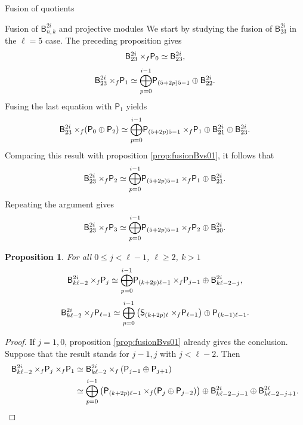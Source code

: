 \documentclass[reqno]{amsart}
\newtheorem{Prop}[Thm]{Proposition}
\newcommand{\ds}[1]{\mathsf S_{#1}}
\newcommand{\dP}[1]{\mathsf P_{#1}}
\newcommand{\xf}{\times\hspace{-0.27em}_f}
\newcommand{\B}[2]{\mathsf{B}^{#1}_{#2}}
\newcommand{\lc}{\ell}
\begin{document}
\begin{section}{Fusion of quotients}
\begin{subsection}{Fusion of $\B{2i}{n,k}$ and projective modules}
We start by studying the fusion of $\B{2i}{23}$ in the $\lc=5$ case. The preceding proposition gives
\begin{equation}
	\B{2i}{23} \xf \dP{0} \simeq \B{2i}{23},
\end{equation}
\begin{equation}
	\B{2i}{23} \xf \dP{1} \simeq \overset{i-1}{\underset{p = 0}{\bigoplus}}\dP{(5+2p) 5 - 1} \oplus \B{2i}{22}.
\end{equation}
Fusing the last equation with $\dP{1}$ yields
\begin{equation}
	\B{2i}{23} \xf (\dP{0} \oplus \dP{2}) \simeq \overset{i-1}{\underset{p = 0}{\bigoplus}}\dP{(5+2p)5-1} \xf \dP{1} \oplus \B{2i}{21} \oplus \B{2i}{23}.
\end{equation}
Comparing this result with proposition \ref{prop:fusionBvs01}, it follows that
\begin{equation}
	\B{2i}{23} \xf \dP{2} \simeq \overset{i-1}{\underset{p = 0}{\bigoplus}}\dP{(5+2p)5-1} \xf \dP{1} \oplus \B{2i}{21}.
\end{equation}
Repeating the argument gives
\begin{equation}
	\B{2i}{23} \xf \dP{3} \simeq \overset{i-1}{\underset{p = 0}{\bigoplus}}\dP{(5+2p)5-1} \xf \dP{2} \oplus \B{2i}{20}.
\end{equation}
\begin{Prop}\label{prop:fusionBvssmallP}
For all $0 \leq j <\lc-1$, $\lc \geq 2$, $k > 1$
\begin{equation}
	\B{2i}{k\lc -2} \xf \dP{j} \simeq \overset{i-1}{\underset{p = 0}{\bigoplus}}\dP{(k+2p)\lc-1} \xf \dP{j-1} \oplus \B{2i}{k\lc-2-j},
\end{equation}
\begin{equation}
	\B{2i}{k\lc -2} \xf \dP{\lc-1} \simeq \overset{i-1}{\underset{p = 0}{\bigoplus}}\left(\ds{(k+2p)\lc} \xf \dP{\lc-1}\right) \oplus \dP{(k-1)\lc -1}.
\end{equation}
\end{Prop}
\begin{proof}
If $j=1,0$, proposition \ref{prop:fusionBvs01} already gives the conclusion. Suppose that the result stands for $j-1,j$ with $ j <\lc-2$. Then 
\begin{align}
\B{2i}{k\lc -2} \xf \dP{j} \xf \dP{1} & \simeq \B{2i}{k\lc -2} \xf \left(\dP{j-1} \oplus \dP{j+1} \right)\\
& \simeq \overset{i-1}{\underset{p = 0}{\bigoplus}}\left(\dP{(k+2p)\lc-1} \xf (\dP{j} \oplus \dP{j-2})\right) \oplus \B{2i}{k\lc-2-j-1} \oplus \B{2i}{k \lc -2 - j+1}.

\end{align}
\end{proof}
\end{subsection}
\end{section}
\end{document}
